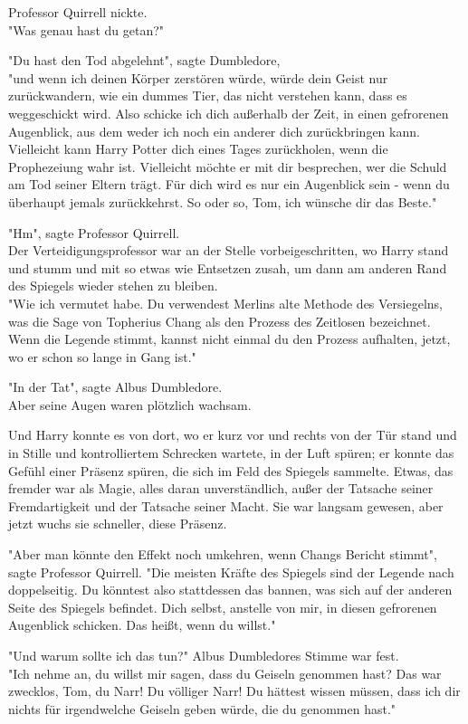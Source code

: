 {Professor Quirrell nickte.\\ "Was genau hast du getan?"

"Du hast den Tod abgelehnt", sagte Dumbledore,\\ "und wenn ich deinen Körper zerstören würde, würde dein Geist nur zurückwandern, wie ein dummes Tier, das nicht verstehen kann, dass es weggeschickt wird. Also schicke ich dich außerhalb der Zeit, in einen gefrorenen Augenblick, aus dem weder ich noch ein anderer dich zurückbringen kann. Vielleicht kann Harry Potter dich eines Tages zurückholen, wenn die Prophezeiung wahr ist. Vielleicht möchte er mit dir besprechen, wer die Schuld am Tod seiner Eltern trägt. Für dich wird es nur ein Augenblick sein - wenn du überhaupt jemals zurückkehrst. So oder so, Tom, ich wünsche dir das Beste."

"Hm", sagte Professor Quirrell.\\ Der Verteidigungsprofessor war an der Stelle vorbeigeschritten, wo Harry stand und stumm und mit so etwas wie Entsetzen zusah, um dann am anderen Rand des Spiegels wieder stehen zu bleiben.\\ "Wie ich vermutet habe. Du verwendest Merlins alte Methode des Versiegelns, was die Sage von Topherius Chang als den Prozess des Zeitlosen bezeichnet. Wenn die Legende stimmt, kannst nicht einmal du den Prozess aufhalten, jetzt, wo er schon so lange in Gang ist."

"In der Tat", sagte Albus Dumbledore.\\ Aber seine Augen waren plötzlich wachsam.

Und Harry konnte es von dort, wo er kurz vor und rechts von der Tür stand und in Stille und kontrolliertem Schrecken wartete, in der Luft spüren; er konnte das Gefühl einer Präsenz spüren, die sich im Feld des Spiegels sammelte. Etwas, das fremder war als Magie, alles daran unverständlich, außer der Tatsache seiner Fremdartigkeit und der Tatsache seiner Macht. Sie war langsam gewesen, aber jetzt wuchs sie schneller, diese Präsenz.

"Aber man könnte den Effekt noch umkehren, wenn Changs Bericht stimmt", sagte Professor Quirrell. "Die meisten Kräfte des Spiegels sind der Legende nach doppelseitig. Du könntest also stattdessen das bannen, was sich auf der anderen Seite des Spiegels befindet. Dich selbst, anstelle von mir, in diesen gefrorenen Augenblick schicken. Das heißt, wenn du willst."

"Und warum sollte ich das tun?" Albus Dumbledores Stimme war fest.\\ "Ich nehme an, du willst mir sagen, dass du Geiseln genommen hast? Das war zwecklos, Tom, du Narr! Du völliger Narr! Du hättest wissen müssen, dass ich dir nichts für irgendwelche Geiseln geben würde, die du genommen hast."

}
